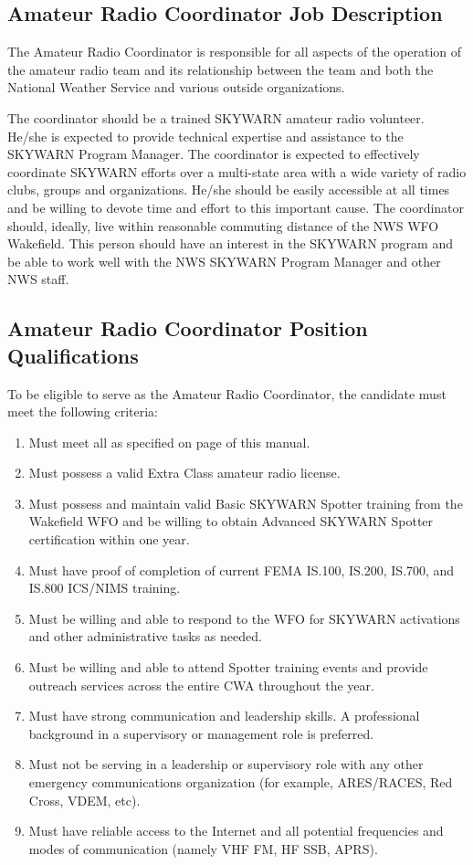 \documentclass[pdflatex,letterpaper,twoside,12pt]{book}
\begin{document}
\subsection{Amateur Radio Coordinator Job Description}\label{arc-jobdesc}

The Amateur Radio Coordinator is responsible for all aspects of the operation of the amateur radio team and its relationship between the team and both the National Weather Service and various outside organizations.

The coordinator should be a trained SKYWARN amateur radio volunteer.  He/she is expected to provide technical expertise and assistance to the SKYWARN Program Manager.  The coordinator is expected to effectively coordinate SKYWARN efforts over a multi-state area with a wide variety of radio clubs, groups and organizations.  He/she should be easily accessible at all times and be willing to devote time and effort to this important cause.  The coordinator should, ideally, live within reasonable commuting distance of the NWS WFO Wakefield.  This person should have an interest in the SKYWARN program and be able to work well with the NWS SKYWARN Program Manager and other NWS staff. 

\subsection{Amateur Radio Coordinator Position Qualifications}

To be eligible to serve as the Amateur Radio Coordinator, the candidate must meet the following criteria:

\begin{enumerate}
\item Must meet all  as specified on page \pageref{nco-criteria} of this manual.
\item Must possess a valid Extra Class amateur radio license.
\item Must possess and maintain valid Basic SKYWARN Spotter training from the Wakefield WFO and be willing to obtain Advanced SKYWARN Spotter certification within one year.
\item Must have proof of completion of current FEMA IS.100, IS.200, IS.700, and IS.800 ICS/NIMS training.
\item Must be willing and able to respond to the WFO for SKYWARN activations and other administrative tasks as needed.
\item Must be willing and able to attend Spotter training events and provide outreach services across the entire CWA throughout the year.
\item Must have strong communication and leadership skills.  A professional background in a supervisory or management role is preferred.
\item Must not be serving in a leadership or supervisory role with any other emergency communications organization (for example, ARES/RACES, Red Cross, VDEM, etc).
\item Must have reliable access to the Internet and all potential frequencies and modes of communication (namely VHF FM, HF SSB, APRS).
\end{enumerate}
\end{document}
